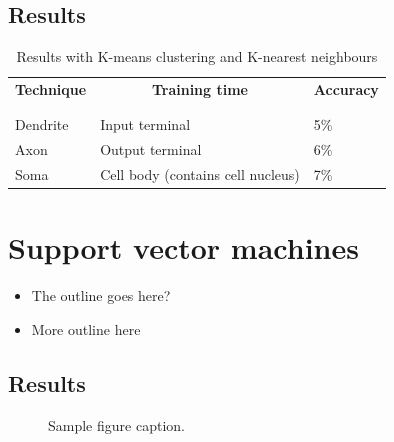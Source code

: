 \documentclass{article} %
\begin{document}
    \subsection{Results} %
    \label{sub:Results}
    \begin{table}[t]
        \caption{Results with K-means clustering and K-nearest neighbours}
        \begin{center}
            \begin{tabular}{lll}
                \multicolumn{1}{c}{\bf Technique} &\multicolumn{1}{c}{\bf Training time} &\multicolumn{1}{c}{\bf Accuracy}\\
                \\ \hline \\
                Dendrite         &Input terminal & 5\% \\
                Axon             &Output terminal & 6\% \\
                Soma             &Cell body (contains cell nucleus) & 7\% \\
            \end{tabular}
        \end{center}
    \end{table}


\section{Support vector machines}
    \begin{itemize}
        \item The outline goes here?
        \item More outline here
    \end{itemize}

    \subsection{Results} %
    \label{sub:Results}
    

\begin{figure}[h]
    \begin{center}
    \fbox{\rule[-.5cm]{0cm}{4cm} \rule[-.5cm]{4cm}{0cm}}
    \end{center}
    \caption{Sample figure caption.}
\end{figure}
\end{document}
